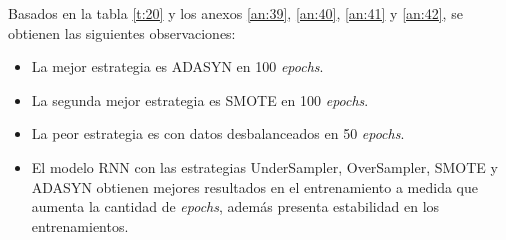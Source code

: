 Basados en la tabla \ref{t:20} y los anexos \ref{an:39}, \ref{an:40}, \ref{an:41} y \ref{an:42}, se obtienen las siguientes observaciones:
\begin{itemize}
	\item La mejor estrategia es ADASYN en 100 \textit{epochs}.
	\item La segunda mejor estrategia es SMOTE en 100 \textit{epochs}.
	\item La peor estrategia es con datos desbalanceados en 50 \textit{epochs}.
	\item El modelo RNN con las estrategias UnderSampler, OverSampler, SMOTE y ADASYN obtienen mejores resultados en el entrenamiento a medida que aumenta la cantidad de \textit{epochs}, adem\'{a}s presenta estabilidad en los entrenamientos.
\end{itemize}

